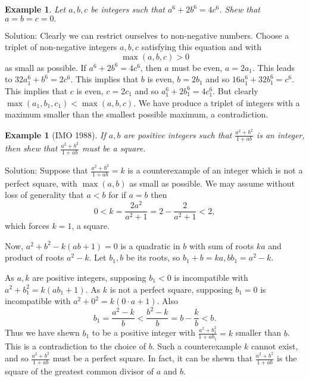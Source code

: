 \documentclass[11pt, openany]{book}
\theoremstyle{change} \theoremheaderfont{\blue\sffamily\bfseries}
\newtheorem{exa}[thm]{Example}
\theoremstyle{nonumberplain} \theoremheaderfont{\sffamily\bfseries}
\newcommand{\dis}{\displaystyle}
\newcommand{\í}{\'{\i}}
\begin{document}
\begin{exa}
Let $a, b, c$ be integers such that $a^6 + 2b^6 = 4c^6$. Shew that
$a = b = c = 0.$
\end{exa}
Solution: Clearly we can restrict ourselves to non-negative
numbers. Choose a triplet of non-negative integers $a, b, c$
satisfying this equation and with
$$\max (a, b, c) > 0$$as small as possible. If $a^6 + 2b^6 = 4c^6$, then $a$ must be even,
$a = 2a_1.$ This leads to $32a_1 ^6 + b^6 = 2c^6.$ This implies
that $b$ is even, $b = 2b_1$ and so $16a_1 ^6 + 32b_1 ^6 = c^6$.
This implies that $c$ is even, $c = 2c_1$ and so $a_1 ^6 + 2b_1 ^6
= 4c_1 ^6$. But clearly $\max (a_1, b_1, c_1) < \max (a, b, c)$.
We have produce a triplet of integers with a maximum smaller than
the smallest possible maximum, a contradiction.
\begin{exa}[IMO 1988] If $a, b$ are positive integers such that
$\dis{\frac{a^2 + b^2}{1 + ab}}$ is an integer, then shew that
$\dis{\frac{a^2 + b^2}{1 + ab}}$ must be a square.
\end{exa}
Solution: Suppose that $\dis{\frac{a^2 + b^2}{1 + ab} = k}$ is a
counterexample of an integer which is not a perfect square, with
$\max (a, b)$ as small as possible. We may assume without loss of
generality that $a < b$ for if $a = b$ then
$$0 < k = \frac{2a^2}{a^2 + 1} = 2 - \frac{2}{a^2 + 1} < 2,$$
which forces $k = 1$, a square.

\bigskip

Now, $a^2 + b^2 - k(ab + 1) = 0$ is a quadratic in $b$ with sum of
roots $ka$ and product of roots $a^2 - k.$ Let $b_1, b$ be its
roots, so $b_1 + b = ka, bb_1 = a^2 - k.$

\bigskip

As $a, k$ are positive integers, supposing $b_1 < 0$ is
incompatible with $a^2 + b_1 ^2 = k(ab_1 + 1)$. As $k$ is not a
perfect square, supposing $b_1 = 0$ is incompatible with $a^2 +
0^2 = k(0\cdot a + 1)$. Also
$$b_1 = \frac{a^2 - k}{b} < \frac{b^2 - k}{b} = b - \frac{k}{b} < b.$$Thus we have shewn $b_1$ to
be a positive integer with $\dis{\frac{a^2 + b_1 ^2}{1 + ab_1} = k}$
smaller than $b$. This is a contradiction to the choice of $b$. Such
a counterexample $k$ cannot exist, and so $\dis{\frac{a^2 + b^2}{1 +
ab}}$ must be a perfect square. In fact, it can be shewn that
$\dis{\frac{a^2 + b^2}{1 + ab}}$ is the square of the greatest
common divisor of $a$ and $b$.

\clearpage
\end{document}
